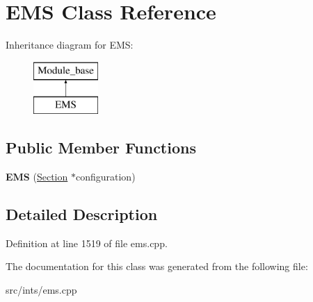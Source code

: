 \hypertarget{classEMS}{\section{E\-M\-S Class Reference}
\label{classEMS}
}
Inheritance diagram for E\-M\-S\-:\begin{figure}[H]
\begin{center}
\leavevmode
\includegraphics[height=2.000000cm]{classEMS}
\end{center}
\end{figure}
\subsection*{Public Member Functions}
\begin{DoxyCompactItemize}
\item 
\hypertarget{classEMS_a580595567b3555bb47ee6d0eb1187815}{{\bfseries E\-M\-S} (\hyperlink{classSection}{Section} $\ast$configuration)}\label{classEMS_a580595567b3555bb47ee6d0eb1187815}

\end{DoxyCompactItemize}


\subsection{Detailed Description}


Definition at line 1519 of file ems.\-cpp.



The documentation for this class was generated from the following file\-:\begin{DoxyCompactItemize}
\item 
src/ints/ems.\-cpp\end{DoxyCompactItemize}
